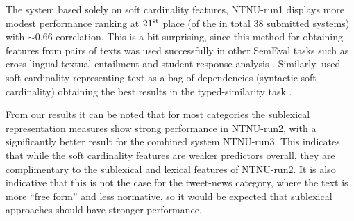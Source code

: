 The system based solely on soft cardinality features, NTNU-run1 displays more modest performance
ranking at $21^{\rm st}$ place (of the in total 38 submitted systems) with ${\sim}0.66$ correlation. 
This is a bit surprising, since this method for obtaining features from pairs of texts was used
successfully in other SemEval tasks such as 
cross-lingual textual entailment \cite{jimenez_soft_2012-1}
and student response analysis \cite{jimenez_softcardinality:_2013}.
Similarly,   used soft cardinality representing 
text as a bag of dependencies (syntactic soft cardinality) obtaining the
best results in the typed-similarity task \cite{croce_unitor-core_2013}. 

From our results it can be noted that for most categories the sublexical representation measures show
strong performance in NTNU-run2, with a significantly better result for the combined system NTNU-run3. 
This indicates that while the soft cardinality features are weaker predictors overall, they are complimentary 
to the sublexical and lexical features of NTNU-run2. 
It is also indicative that this is not the case for the tweet-news category, where the text is more ``free form'' 
and less normative, so it would be expected that sublexical approaches should have stronger performance.

